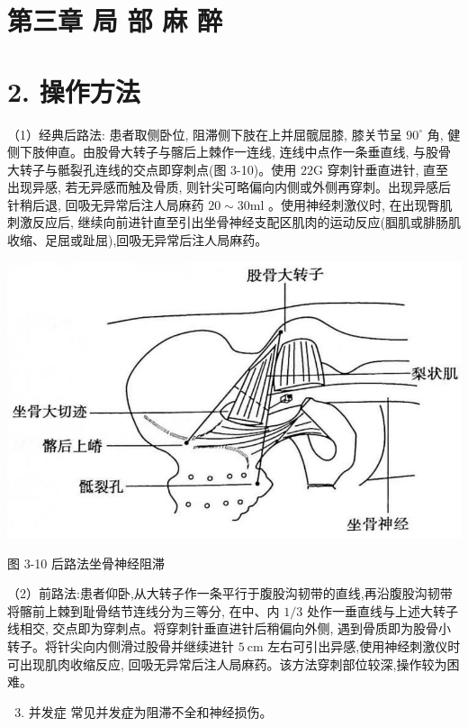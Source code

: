 \documentclass[10pt]{article}
\begin{document}
\section*{第三章 局 部 麻 醉}
\section*{2. 操作方法}
（1）经典后路法: 患者取侧卧位, 阻滞侧下肢在上并屈髋屈膝, 膝关节呈 $90^{\circ}$ 角, 健侧下肢伸直。由股骨大转子与髂后上棘作一连线, 连线中点作一条垂直线, 与股骨大转子与骶裂孔连线的交点即穿刺点(图 3-10)。使用 $22 \mathrm{G}$ 穿刺针垂直进针, 直至出现异感, 若无异感而触及骨质, 则针尖可略偏向内侧或外侧再穿刺。出现异感后针稍后退, 回吸无异常后注人局麻药 $20 \sim 30 \mathrm{ml}$ 。使用神经刺激仪时, 在出现臀肌刺激反应后, 继续向前进针直至引出坐骨神经支配区肌肉的运动反应(腘肌或腓肠肌收缩、足屈或趾屈),回吸无异常后注人局麻药。

\begin{center}
\includegraphics[max width=\textwidth]{2024_07_09_002a177993bd97d1d6d7g-057}
\end{center}

图 3-10 后路法坐骨神经阻滞

（2）前路法:患者仰卧,从大转子作一条平行于腹股沟韧带的直线,再沿腹股沟韧带将髂前上棘到耻骨结节连线分为三等分, 在中、内 $1 / 3$ 处作一垂直线与上述大转子线相交, 交点即为穿刺点。将穿刺针垂直进针后稍偏向外侧, 遇到骨质即为股骨小转子。将针尖向内侧滑过股骨并继续进针 $5 \mathrm{~cm}$ 左右可引出异感,使用神经刺激仪时可出现肌肉收缩反应, 回吸无异常后注人局麻药。该方法穿刺部位较深,操作较为困难。

\begin{enumerate}
  \setcounter{enumi}{2}
  \item 并发症 常见并发症为阻滞不全和神经损伤。
\end{enumerate}
\end{document}
